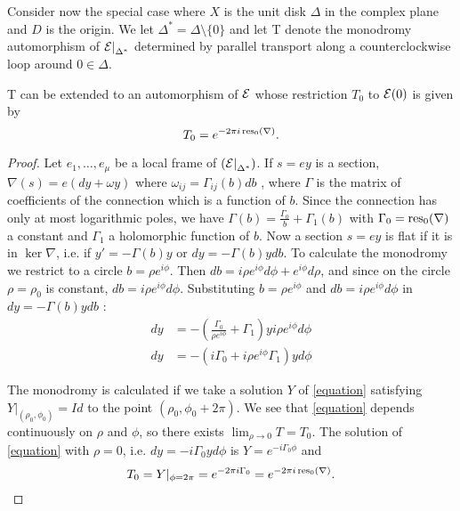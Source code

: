 \documentclass[../main.tex]{subfiles}
\begin{document}
Consider now the special case where $X$ is the unit disk $\Delta$ in the complex plane and $D$ is the origin. We let $\Delta^* = \Delta \setminus \{0\}$ and let T denote the monodromy automorphism of $ {\mathcal{E}|}_{\Delta^*} $ determined by parallel transport along a counterclockwise loop around $0 \in \Delta$.
%
%
\begin{proposition}\label{T=res}
T can be extended to an automorphism of $\mathcal{E}$ whose restriction $T_0$ to $\mathcal{E}(0)$ is given by
\[
T_0 = e^{-2\pi i \operatorname{res}_0(\nabla)}.
\]
\end{proposition}
\begin{proof}
    Let $e_1, \dots, e_\mu$ be a local frame of $({\mathcal{E}|}_{\Delta^*} )$. If $s=ey$ is a section, $\nabla(s)=e(dy+\omega y)$ where $\omega_{ij}=\Gamma_{ij}(b)db$ , where $\Gamma$ is the matrix of coefficients of the connection which is a function of $b$. Since the connection has only at most logarithmic poles, we have $\Gamma(b) = \frac{\Gamma_0}{b} + \Gamma_1(b)$ with $\Gamma_0 = \operatorname{res}_0(\nabla)$ a constant and $\Gamma_1$ a holomorphic function of $b$. Now a section $s=ey$ is flat if it is in $\ker \nabla$, i.e. if $y' = -\Gamma(b) y$ or $dy = -\Gamma(b)y db$.
    To calculate the monodromy we restrict to a circle $b=\rho e^{i \phi}$. Then $db = i \rho e^{i \phi} d\phi + e^{i \phi} d\rho$, and since on the circle $\rho=\rho_0$ is constant, $db = i \rho e^{i \phi} d\phi$. Substituting $b=\rho e^{i \phi}$ and $db = i \rho e^{i \phi} d\phi$ in $dy = -\Gamma(b)y db$ :
    \begin{align}
    dy &= -\left( \frac{\Gamma_0}{\rho e^{i\phi}}+ \Gamma_1 \right)  y i \rho e^{i \phi} d\phi  \nonumber \\
    dy &= -(i \Gamma_0 + i \rho e^{i \phi} \Gamma_1) y d\phi \label{equation} \tag{$\ast$}
    \end{align}
    
    The monodromy is calculated if we take a solution $Y$ of \eqref{equation} satisfying $Y|_{(\rho_0,\phi_0)} = Id$ to the point $(\rho_0,\phi_0 + 2 \pi)$.
    We see that \eqref{equation} depends continuously on $\rho$ and $\phi$, so there exists $\lim_{\rho \to 0} T = T_0$. 
    The solution of \eqref{equation} with $\rho =0$, i.e. $dy = -i \Gamma_0  y d\phi$ is $Y=e^{-i \Gamma_0 \phi}$ and 
    \[
    T_0 = Y|_{\phi=2\pi} = e^{-2\pi i \Gamma_0} = e^{-2\pi i \operatorname{res}_0(\nabla)}.
    \]
\end{proof}
\end{document}
